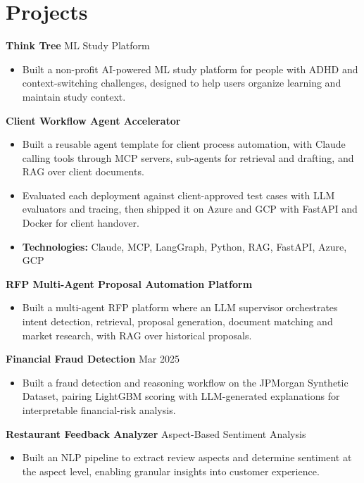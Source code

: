 \documentclass[10pt,a4paper]{article}
\begin{document}
\section{Projects}
\textbf{Think Tree} \textbar{} ML Study Platform\par
\begin{itemize}
  \item Built a non-profit AI-powered ML study platform for people with ADHD and context-switching challenges, designed to help users organize learning and maintain study context.
\end{itemize}
\textbf{Client Workflow Agent Accelerator}\par
\begin{itemize}
  \item Built a reusable agent template for client process automation, with Claude calling tools through MCP servers, sub-agents for retrieval and drafting, and RAG over client documents.
  \item Evaluated each deployment against client-approved test cases with LLM evaluators and tracing, then shipped it on Azure and GCP with FastAPI and Docker for client handover.
  \item \textbf{Technologies:} Claude, MCP, LangGraph, Python, RAG, FastAPI, Azure, GCP
\end{itemize}
\textbf{RFP Multi-Agent Proposal Automation Platform}\par
\begin{itemize}
  \item Built a multi-agent RFP platform where an LLM supervisor orchestrates intent detection, retrieval, proposal generation, document matching and market research, with RAG over historical proposals.
\end{itemize}
\textbf{Financial Fraud Detection} \textbar{} Mar 2025\par
\begin{itemize}
  \item Built a fraud detection and reasoning workflow on the JPMorgan Synthetic Dataset, pairing LightGBM scoring with LLM-generated explanations for interpretable financial-risk analysis.
\end{itemize}
\textbf{Restaurant Feedback Analyzer} \textbar{} Aspect-Based Sentiment Analysis\par
\begin{itemize}
  \item Built an NLP pipeline to extract review aspects and determine sentiment at the aspect level, enabling granular insights into customer experience.
\end{itemize}
\end{document}
